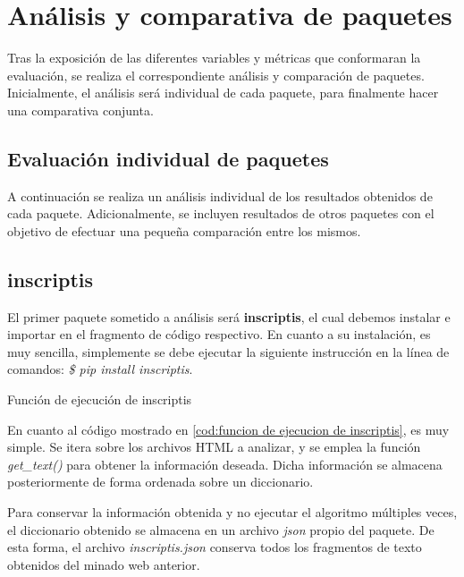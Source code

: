 \chapter{Análisis y comparativa de paquetes}
\label{cha:analisis y comparativa de paquetes}

Tras la exposición de las diferentes variables y métricas que conformaran la evaluación, se realiza el
correspondiente análisis y comparación de paquetes. Inicialmente, el análisis será individual de cada 
paquete, para finalmente hacer una comparativa conjunta.

\section{Evaluación individual de paquetes}
\label{sec:evaluacion individual de paquetes}

A continuación se realiza un análisis individual de los resultados obtenidos de cada paquete. Adicionalmente, 
se incluyen resultados de otros paquetes con el objetivo de efectuar una pequeña comparación entre los 
mismos.

\section*{inscriptis}

El primer paquete sometido a análisis será \textbf{inscriptis}, el cual debemos instalar e importar en el
fragmento de código respectivo. En cuanto a su instalación, es muy sencilla, simplemente se debe ejecutar
la siguiente instrucción en la línea de comandos: \emph{\$ pip install inscriptis}.

\begin{codefloat}
    
    \caption{Función de ejecución de inscriptis}
    \label{cod:funcion de ejecucion de inscriptis}
\end{codefloat}

En cuanto al código mostrado en \ref{cod:funcion de ejecucion de inscriptis}, es muy simple. Se itera sobre 
los archivos HTML a analizar, y se emplea la función \emph{get\_text()} para obtener la información deseada. 
Dicha información se almacena posteriormente de forma ordenada sobre un diccionario.

Para conservar la información obtenida y no ejecutar el algoritmo múltiples veces, el diccionario obtenido
se almacena en un archivo \emph{json} propio del paquete. De esta forma, el archivo \emph{inscriptis.json} 
conserva todos los fragmentos de texto obtenidos del minado web anterior.

